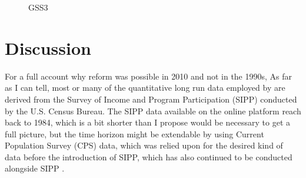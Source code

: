 \documentclass[11pt]{article}
\begin{document}
\begin{figure}[H]
  \sffamily
  \caption{GSS3}
  
  \label{fig:gss3}
\end{figure}




\section*{Discussion}
For a full account why reform was possible in 2010 and not in the 1990s, As far as I can tell, most or many of the quantitative long run data employed by \textcite[][]{Jacobs2014} are derived from the Survey of Income and Program Participation (SIPP) conducted by the U.S. Census Bureau. The SIPP data available on the online platform reach back to 1984, which is a bit shorter than I propose would be necessary to get a full picture, but the time horizon might be extendable by using Current Population Survey (CPS) data, which was relied upon for the desired kind of data before the introduction of SIPP, which has also continued to be conducted alongside SIPP \parencite[][]{Census2022}.

\newpage
\thispagestyle{empty}
\begingroup
{}
\printbibliography
\endgroup
\end{document}
